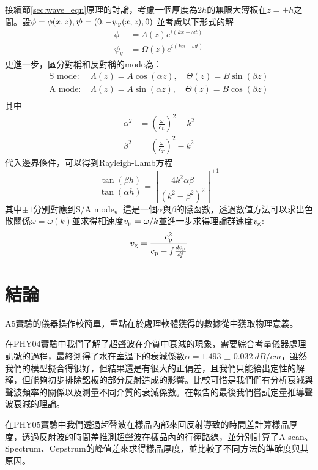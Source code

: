 \documentclass[12pt]{report}
\begin{document}
接續節\ref{sec:wave_eqn}原理的討論，考慮一個厚度為$2h$的無限大薄板在$z=\pm h$之間。設$\phi=\phi(x,z), \boldsymbol{\mathbf{\psi}}=(0,-\psi_y(x,z),0)$
並考慮以下形式的解
\begin{align}
    \phi&=\Lambda(z)e^{i(kx-\omega t)} \\
    \psi_y&=\Omega(z)e^{i(kx-\omega t)}
\end{align}
更進一步，區分對稱和反對稱的mode為：
\begin{align}
    \text{S mode: } & \Lambda(z)=A\cos(\alpha z),\quad \Theta(z)=B\sin(\beta z) \\
    \text{A mode: } & \Lambda(z)=A\sin(\alpha z),\quad \Theta(z)=B\cos(\beta z) \\
\end{align}
其中
\begin{align}
    \alpha^2&=\left(\frac{\omega}{c_L}\right)^2-k^2 \\
    \beta^2&=\left(\frac{\omega}{c_T}\right)^2-k^2 
\end{align}
代入邊界條件，可以得到Rayleigh-Lamb方程
\begin{equation}
    \frac{\tan(\beta h)}{\tan(\alpha h)}=\left[ 
    \frac{4k^2\alpha\beta}{(k^2-\beta^2)^2}
    \right]^{\pm 1}
\end{equation}
其中$\pm 1$分別對應到S/A mode。這是一個$\alpha$與$\beta$的隱函數，透過數值方法可以求出色散關係$\omega=\omega(k)$並求得相速度$v_{\rm p}=\omega/k$並進一步求得理論群速度$v_{\rm g}$:
\begin{equation}
    v_{\rm g} = \frac{c_{\rm p}^2}{c_{\rm p}-f\frac{dc_{\rm p}}{df}}
\end{equation}

\chapter{結論}

A5實驗的儀器操作較簡單，重點在於處理軟體獲得的數據從中獲取物理意義。

在PHY04實驗中我們了解了超聲波在介質中衰減的現象，需要綜合考量儀器處理訊號的過程，最終測得了水在室溫下的衰減係數$\alpha=\SI{1.493(32)}{dB/cm}$，雖然我們的模型擬合得很好，但結果還是有很大的正偏差，且我們只能給出定性的解釋，但能夠初步排除鋁板的部分反射造成的影響。比較可惜是我們們有分析衰減與聲波頻率的關係以及測量不同介質的衰減係數。在報告的最後我們嘗試定量推導聲波衰減的理論。

在PHY05實驗中我們透過超聲波在樣品內部來回反射導致的時間差計算樣品厚度，透過反射波的時間差推測超聲波在樣品內的行徑路線，並分別計算了A-scan、Spectrum、Cepstrum的峰值差來求得樣品厚度，並比較了不同方法的準確度與其原因。
\end{document}
